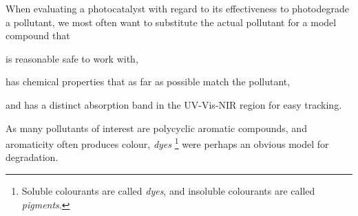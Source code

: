 \documentclass[webedition,openright,titles,swedish,english]{LuaUUThesis}\usepackage[]{graphicx}\usepackage[]{xcolor}
\begin{document}
When evaluating a photocatalyst with regard to its effectiveness to photodegrade
a pollutant, we most often want to substitute the actual pollutant for a model
compound that
\begin{enumerate*}[label=(\alph*)]
\item is reasonable safe to work with,
\item has chemical properties that as far as possible match the pollutant,
\item and has a distinct absorption band in the \gls{UV-Vis-NIR} region for easy tracking.
\end{enumerate*}
As many pollutants of interest are polycyclic aromatic compounds,
and aromaticity often produces colour, \emph{dyes}%
\footnote{%
   Soluble colourants are called \emph{dyes},
   and insoluble colourants are called \emph{pigments}.
}
were perhaps an obvious model for  degradation.

%
\end{document}
